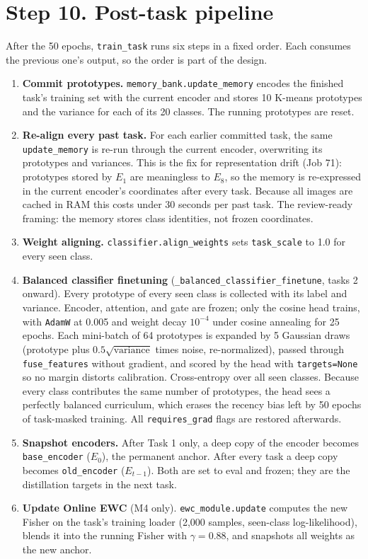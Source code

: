 \documentclass[11pt,a4paper]{article}
\newcommand{\code}[1]{\texttt{#1}}
\begin{document}
\section{Step 10. Post-task pipeline}

After the 50 epochs, \code{train\_task} runs six steps in a fixed order. Each consumes the previous one's output, so the order is part of the design.
\begin{enumerate}
  \item \textbf{Commit prototypes.} \code{memory\_bank.update\_memory} encodes the finished task's training set with the current encoder and stores 10 K-means prototypes and the variance for each of its 20 classes. The running prototypes are reset.
  \item \textbf{Re-align every past task.} For each earlier committed task, the same \code{update\_memory} is re-run through the current encoder, overwriting its prototypes and variances. This is the fix for representation drift (Job 71): prototypes stored by $E_1$ are meaningless to $E_8$, so the memory is re-expressed in the current encoder's coordinates after every task. Because all images are cached in RAM this costs under 30 seconds per past task. The review-ready framing: the memory stores class identities, not frozen coordinates.
  \item \textbf{Weight aligning.} \code{classifier.align\_weights} sets \code{task\_scale} to 1.0 for every seen class.
  \item \textbf{Balanced classifier finetuning} (\code{\_balanced\_classifier\_finetune}, tasks 2 onward). Every prototype of every seen class is collected with its label and variance. Encoder, attention, and gate are frozen; only the cosine head trains, with \code{AdamW} at 0.005 and weight decay $10^{-4}$ under cosine annealing for 25 epochs. Each mini-batch of 64 prototypes is expanded by 5 Gaussian draws (prototype plus $0.5\sqrt{\mathrm{variance}}$ times noise, re-normalized), passed through \code{fuse\_features} without gradient, and scored by the head with \code{targets=None} so no margin distorts calibration. Cross-entropy over all seen classes. Because every class contributes the same number of prototypes, the head sees a perfectly balanced curriculum, which erases the recency bias left by 50 epochs of task-masked training. All \code{requires\_grad} flags are restored afterwards.
  \item \textbf{Snapshot encoders.} After Task 1 only, a deep copy of the encoder becomes \code{base\_encoder} ($E_0$), the permanent anchor. After every task a deep copy becomes \code{old\_encoder} ($E_{t-1}$). Both are set to eval and frozen; they are the distillation targets in the next task.
  \item \textbf{Update Online EWC} (M4 only). \code{ewc\_module.update} computes the new Fisher on the task's training loader (2{,}000 samples, seen-class log-likelihood), blends it into the running Fisher with $\gamma = 0.88$, and snapshots all weights as the new anchor.
\end{enumerate}
\end{document}
